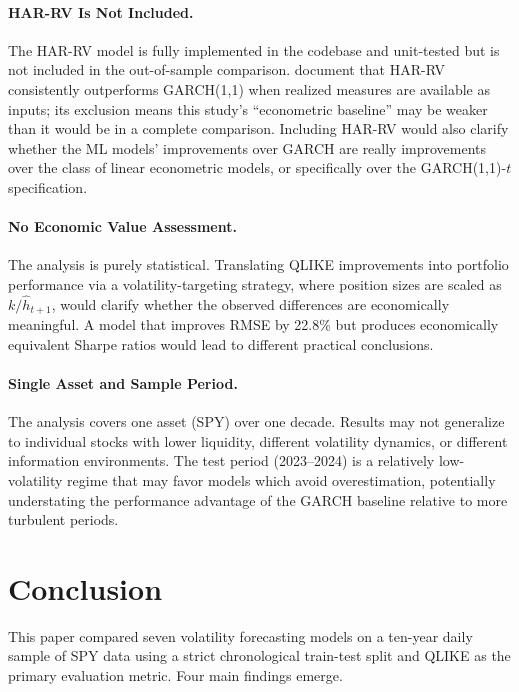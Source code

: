 \documentclass[12pt]{article}
\begin{document}
\paragraph{HAR-RV Is Not Included.}
The HAR-RV model \citep{Corsi2009} is fully implemented in the codebase and
unit-tested but is not included in the out-of-sample comparison.
\citet{HansenLunde2005} document that HAR-RV consistently outperforms
GARCH(1,1) when realized measures are available as inputs; its exclusion means
this study's ``econometric baseline'' may be weaker than it would be in a
complete comparison.  Including HAR-RV would also clarify whether the ML
models' improvements over GARCH are really improvements over the class of
linear econometric models, or specifically over the GARCH(1,1)-$t$
specification.

\paragraph{No Economic Value Assessment.}
The analysis is purely statistical.  Translating QLIKE improvements into
portfolio performance via a volatility-targeting strategy, where position
sizes are scaled as $k/\hat{h}_{t+1}$, would clarify whether the observed
differences are economically meaningful.  A model that improves RMSE by 22.8\%
but produces economically equivalent Sharpe ratios would lead to different
practical conclusions.

\paragraph{Single Asset and Sample Period.}
The analysis covers one asset (SPY) over one decade.  Results may not
generalize to individual stocks with lower liquidity, different volatility
dynamics, or different information environments.  The test period
(2023--2024) is a relatively low-volatility regime that may favor models
which avoid overestimation, potentially understating the performance advantage
of the GARCH baseline relative to more turbulent periods.


\section{Conclusion}
\label{sec:conc}

This paper compared seven volatility forecasting models on a ten-year daily
sample of SPY data using a strict chronological train-test split and QLIKE as
the primary evaluation metric.  Four main findings emerge.
\end{document}

